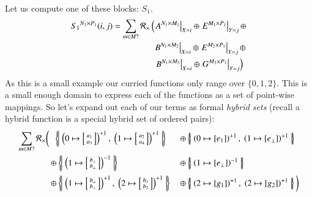 Let us compute one of these blocks: $S_1$.
\begin{align*}
	{S_1}^{N_1 \times P_1}(i,j) = \sum_{m \in M ?} \R[\times]  &\left( 
			\left. A^{N_1 \times M_1}\right|_{X=i} \oplus
			\left. E^{M_1 \times P_1}\right|_{Y=j} \oplus \right.\\
			&\;\left. B^{N_1 \times M_2}\right|_{X=i} \oplus
			\left. E^{M_2 \times P_1}\right|_{Y=j} \oplus\\ 
			&\;\left. \left. B^{N_1 \times M_3}\right|_{X=i} \oplus
			\left. G^{M_3 \times P_1}\right|_{Y=j}
	\right)
\end{align*}
As this is a small example our curried functions only range over $\{ 0, 1, 2 \}$.
This is a small enough domain to express each of the functions as a set of point-wise mappings.
So let's expand out each of our terms as formal \emph{hybrid sets} 
(recall a hybrid function is a special hybrid set of ordered pairs):
\begin{align*}
	\sum_{m \in M ?} \R[\times] \bigg( 
		&\;\;\hset{
			\left( 0 \mapsto 
				\left[\begin{smallmatrix}\vphantom{b}a_1 \\ \vphantom{b}a_3 \end{smallmatrix}\right]
			\right)^{+1}, \;
			\left( 1 \mapsto 
				\left[\begin{smallmatrix}\vphantom{b}a_2 \\ \vphantom{b}a_4 \end{smallmatrix}\right]
			\right)^{+1}}  
		&&\oplus \hset{ 
			\left( 0 \mapsto [ e_1 ] \right)^{+1}, \;
			\left( 1 \mapsto [e_\bot] \right)^{+1}} \\ 
		&\oplus \hset{ 
			\left( 1 \mapsto \left[\begin{smallmatrix} b_\bot \\ b_\bot \end{smallmatrix}\right] \right)^{-1} }
		&&\oplus \hset{ 
			\left( 1 \mapsto [ e_\bot ] \right)^{-1} } \\
		&\oplus \hset{
			\left( 1 \mapsto \left[ \begin{smallmatrix} b_\bot \\ b_\bot \end{smallmatrix} \right] \right)^{+1}, \;
			\left( 2 \mapsto \left[ \begin{smallmatrix} b_1 \\ b_2 \end{smallmatrix}\right] \right)^{+1} }
		&&\oplus \hset{
			\left( 2 \mapsto [ g_1 ] \right)^{+1},\; 
			\left( 2 \mapsto [ g_2 ] \right)^{+1}}	\bigg)
\end{align*}


